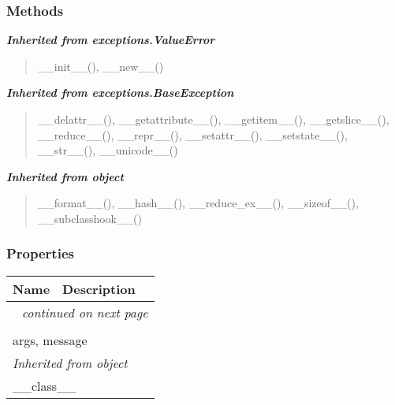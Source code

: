 
  \subsubsection{Methods}


\large{\textbf{\textit{Inherited from exceptions.ValueError}}}

\begin{quote}
\_\_init\_\_(), \_\_new\_\_()
\end{quote}

\large{\textbf{\textit{Inherited from exceptions.BaseException}}}

\begin{quote}
\_\_delattr\_\_(), \_\_getattribute\_\_(), \_\_getitem\_\_(), \_\_getslice\_\_(), \_\_reduce\_\_(), \_\_repr\_\_(), \_\_setattr\_\_(), \_\_setstate\_\_(), \_\_str\_\_(), \_\_unicode\_\_()
\end{quote}

\large{\textbf{\textit{Inherited from object}}}

\begin{quote}
\_\_format\_\_(), \_\_hash\_\_(), \_\_reduce\_ex\_\_(), \_\_sizeof\_\_(), \_\_subclasshook\_\_()
\end{quote}


  \subsubsection{Properties}

    \vspace{-1cm}
\hspace{\varindent}\begin{longtable}{|p{\varnamewidth}|p{\vardescrwidth}|l}
\cline{1-2}
\cline{1-2} \centering \textbf{Name} & \centering \textbf{Description}& \\
\cline{1-2}
\endhead\cline{1-2}\multicolumn{3}{r}{\small\textit{continued on next page}}\\\endfoot\cline{1-2}
\endlastfoot\multicolumn{2}{|l|}{\textit{Inherited from exceptions.BaseException}}\\
\multicolumn{2}{|p{\varwidth}|}{\raggedright args, message}\\
\cline{1-2}
\multicolumn{2}{|l|}{\textit{Inherited from object}}\\
\multicolumn{2}{|p{\varwidth}|}{\raggedright \_\_class\_\_}\\
\cline{1-2}
\end{longtable}

